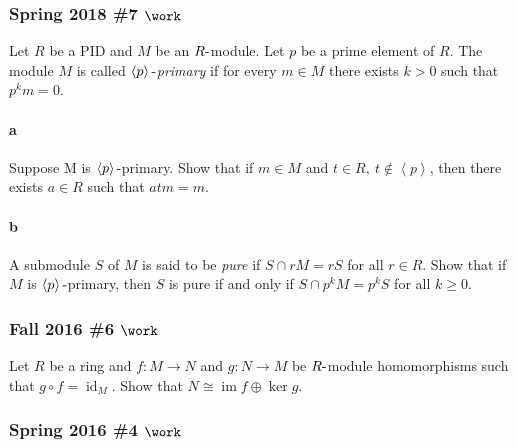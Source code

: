 \hypertarget{spring-2018-7-work}{%
\subsubsection{\texorpdfstring{Spring 2018 \#7
\(\work\)}{Spring 2018 \#7 \textbackslash work}}\label{spring-2018-7-work}}

Let \(R\) be a PID and \(M\) be an \(R{\hbox{-}}\)module. Let \(p\) be a
prime element of \(R\). The module \(M\) is called
\emph{\(\left\langle{p}\right\rangle{\hbox{-}}\)primary} if for every
\(m \in M\) there exists \(k > 0\) such that \(p^k m = 0\).

\hypertarget{a-86}{%
\paragraph{a}\label{a-86}}

Suppose M is \(\left\langle{p}\right\rangle{\hbox{-}}\)primary. Show
that if \(m \in M\) and
\(t \in R, ~t \not\in \left\langle{p}\right\rangle\), then there exists
\(a \in R\) such that \(atm = m\).

\hypertarget{b-76}{%
\paragraph{b}\label{b-76}}

A submodule \(S\) of \(M\) is said to be \emph{pure} if
\(S \cap r M = rS\) for all \(r \in R\). Show that if \(M\) is
\(\left\langle{p}\right\rangle{\hbox{-}}\)primary, then \(S\) is pure if
and only if \(S \cap p^k M = p^k S\) for all \(k \geq 0\).

\hypertarget{fall-2016-6-work}{%
\subsubsection{\texorpdfstring{Fall 2016 \#6
\(\work\)}{Fall 2016 \#6 \textbackslash work}}\label{fall-2016-6-work}}

Let \(R\) be a ring and \(f: M\to N\) and \(g: N\to M\) be
\(R{\hbox{-}}\)module homomorphisms such that
\(g\circ f = \operatorname{id}_M\). Show that
\(N\cong \operatorname{im}f \oplus \ker g\).

\hypertarget{spring-2016-4-work}{%
\subsubsection{\texorpdfstring{Spring 2016 \#4
\(\work\)}{Spring 2016 \#4 \textbackslash work}}\label{spring-2016-4-work}}

